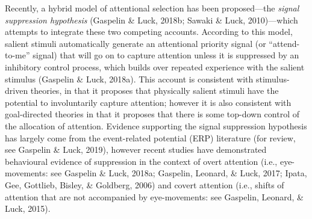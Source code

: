 \documentclass[man, a4paper, noextraspace, 11pt,floatsintext]{apa6}
\theoremstyle{definition}
\theoremstyle{definition}
\theoremstyle{definition}
\theoremstyle{remark}
\begin{document}
Recently, a hybrid model of attentional selection has been
proposed---the \emph{signal suppression hypothesis} (Gaspelin \& Luck,
2018b; Sawaki \& Luck, 2010)---which attempts to integrate these two
competing accounts. According to this model, salient stimuli
automatically generate an attentional priority signal (or
\enquote{attend-to-me} signal) that will go on to capture attention
unless it is suppressed by an inhibitory control process, which builds
over repeated experience with the salient stimulus (Gaspelin \& Luck,
2018a). This account is consistent with stimulus-driven theories, in
that it proposes that physically salient stimuli have the potential to
involuntarily capture attention; however it is also consistent with
goal-directed theories in that it proposes that there is some top-down
control of the allocation of attention. Evidence supporting the signal
suppression hypothesis has largely come from the event-related potential
(ERP) literature (for review, see Gaspelin \& Luck, 2019), however
recent studies have demonstrated behavioural evidence of suppression in
the context of overt attention (i.e., eye-movements: see Gaspelin \&
Luck, 2018a; Gaspelin, Leonard, \& Luck, 2017; Ipata, Gee, Gottlieb,
Bisley, \& Goldberg, 2006) and covert attention (i.e., shifts of
attention that are not accompanied by eye-movements: see Gaspelin,
Leonard, \& Luck, 2015).
\end{document}
